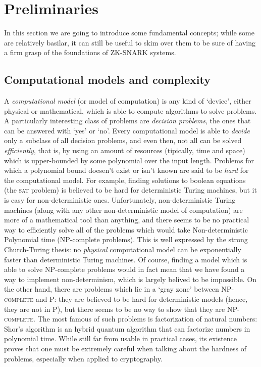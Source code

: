 
\section{Preliminaries}\label{sec:vanilla}
In this section we are going to introduce some fundamental concepts;
while some are relatively basilar, it can still be useful to skim over them to be sure of having
a firm grasp of the foundations of ZK-SNARK systems.
\subsection{Computational models and complexity}
A \emph{computational model} (or model of computation) is any kind of `device', either physical or
mathematical, which is able to compute algorithms to solve problems.
A particularly interesting class of problems are \emph{decision problems}, the ones that can be
answered with `yes' or `no'.
Every computational model is able to \emph{decide} only a subclass of all decision problems, and
even then, not all can be solved \emph{efficiently}, that is, by using an amount of resources
(tipically, time and space) which is upper-bounded by some polynomial over the input length.
Problems for which a polynomial bound doesen't exist or isn't known are said to be \emph{hard} for
the computational model.
For example, finding solutions to boolean equations (the \textsc{sat} problem) is believed to be
hard for deterministic Turing machines, but it is easy for non-deterministic ones.
Unfortunately, non-deterministic Turing machines (along with any other non-deterministic model of
computation) are more of a mathematical tool than anything, and there seems to be no practical way
to efficiently solve all of the problems which would take Non-deterministic Polynomial time
(NP-complete problems).
This is well expressed by the strong Church-Turing thesis: no \emph{physical} computational model
can be exponentially faster than deterministic Turing machines.
Of course, finding a model which is able to solve NP-complete problems would in fact mean that we
have found a way to implement non-determinism, which is largely belived to be impossible.
On the other hand, there are problems which lie in a `gray zone' between \textsc{NP-complete} and
\textsc{P}: they are believed to be hard for deterministic models (hence, they are not in \textsc{P}),
but there seems to be no way to show that they are \textsc{NP-complete}.
The most famous of such problems is factorization of natural numbers: Shor's algorithm is an
hybrid quantum algorithm that can factorize numbers in polynomial time.
While still far from usable in practical cases, its existence proves that one must be extremely
careful when talking about the hardness of problems, especially when applied to cryptography.

